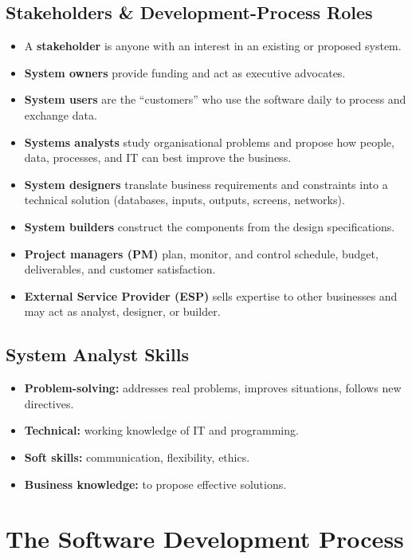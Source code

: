 \documentclass[hidelinks]{article}
\begin{document}
\subsection{Stakeholders \& Development-Process Roles}
\begin{itemize}
  \item A \textbf{stakeholder} is anyone with an interest in an existing or proposed system.
  \item \textbf{System owners} provide funding and act as executive advocates.
  \item \textbf{System users} are the ``customers'' who use the software daily to process and
        exchange data.
  \item \textbf{Systems analysts} study organisational problems and propose how people, data,
        processes, and IT can best improve the business.
  \item \textbf{System designers} translate business requirements and constraints into a
        technical solution (databases, inputs, outputs, screens, networks).
  \item \textbf{System builders} construct the components from the design specifications.
  \item \textbf{Project managers (PM)} plan, monitor, and control schedule, budget,
        deliverables, and customer satisfaction.
  \item \textbf{External Service Provider (ESP)} sells expertise to other businesses and may act
        as analyst, designer, or builder.
\end{itemize}

\subsection{System Analyst Skills}
\begin{itemize}
  \item \textbf{Problem-solving:} addresses real problems, improves situations, follows new directives.
  \item \textbf{Technical:} working knowledge of IT and programming.
  \item \textbf{Soft skills:} communication, flexibility, ethics.
  \item \textbf{Business knowledge:} to propose effective solutions.
\end{itemize}

\section{The Software Development Process}
\end{document}
